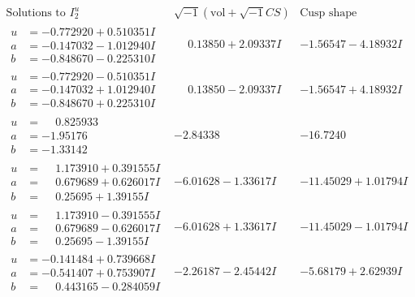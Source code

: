 \documentclass[1p]{elsarticle_modified}
\theoremstyle{definition}
\newcommand{\I}{\sqrt{-1}}
\begin{document}
$$\begin{array}{c|c|c}  
\text{Solutions to }I^u_{2}& \I (\text{vol} + \sqrt{-1}CS) & \text{Cusp shape}\\
 \hline 
\begin{aligned}
u &= -0.772920 + 0.510351 I \\
a &= -0.147032 - 1.012940 I \\
b &= -0.848670 - 0.225310 I\end{aligned}
 & \phantom{-}0.13850 + 2.09337 I & -1.56547 - 4.18932 I \\ \hline\begin{aligned}
u &= -0.772920 - 0.510351 I \\
a &= -0.147032 + 1.012940 I \\
b &= -0.848670 + 0.225310 I\end{aligned}
 & \phantom{-}0.13850 - 2.09337 I & -1.56547 + 4.18932 I \\ \hline\begin{aligned}
u &= \phantom{-}0.825933\phantom{ +0.000000I} \\
a &= -1.95176\phantom{ +0.000000I} \\
b &= -1.33142\phantom{ +0.000000I}\end{aligned}
 & -2.84338\phantom{ +0.000000I} & -16.7240\phantom{ +0.000000I} \\ \hline\begin{aligned}
u &= \phantom{-}1.173910 + 0.391555 I \\
a &= \phantom{-}0.679689 + 0.626017 I \\
b &= \phantom{-}0.25695 + 1.39155 I\end{aligned}
 & -6.01628 - 1.33617 I & -11.45029 + 1.01794 I \\ \hline\begin{aligned}
u &= \phantom{-}1.173910 - 0.391555 I \\
a &= \phantom{-}0.679689 - 0.626017 I \\
b &= \phantom{-}0.25695 - 1.39155 I\end{aligned}
 & -6.01628 + 1.33617 I & -11.45029 - 1.01794 I \\ \hline\begin{aligned}
u &= -0.141484 + 0.739668 I \\
a &= -0.541407 + 0.753907 I \\
b &= \phantom{-}0.443165 - 0.284059 I\end{aligned}
 & -2.26187 - 2.45442 I & -5.68179 + 2.62939 I \\ \hline\begin{aligned}

\end{aligned}
\end{array}$$
\end{document}
